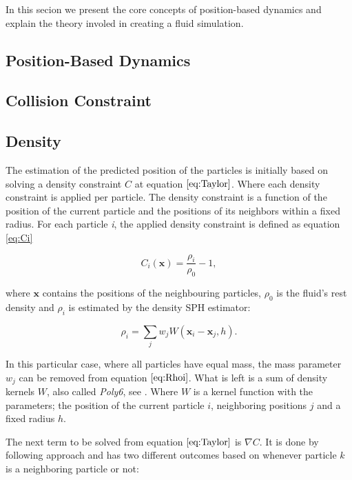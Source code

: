 In this secion we present the core concepts of position-based dynamics and
explain the theory involed in creating a fluid simulation.

\subsection{Position-Based Dynamics}



\subsection{Collision Constraint}


\subsection{Density}

The estimation of the predicted position of the particles is initially based on
solving a density constraint $C$ at equation $\ref{eq:Taylor}$. Where each
density constraint is applied per particle. The density constraint is a
function of the position of the current particle and the positions of its
neighbors within a fixed radius. For each particle \textit{i}, the applied
density constraint is defined as equation \ref{eq:Ci}

\begin{equation}
\label{eq:Ci}
C_i(\mathbf{x}) = \frac{\rho_i}{\rho_0} - 1,
\end{equation}

where $\mathbf{x}$ contains the positions of the neighbouring particles,
$\rho_0$ is the fluid's rest density and $\rho_i$ is estimated by the density
SPH estimator:

\begin{equation}
\label{eq:Rhoi}
\rho_i = \sum\limits_{j} w_j W(\mathbf{x}_i - \mathbf{x}_j, h).
\end{equation}

In this particular case, where all particles have equal mass, the mass
parameter $w_j$ can be removed from equation $\ref{eq:Rhoi}$. What is left is a
sum of density kernels $W$, also called \textit{Poly6}, see
\cite{muller2003particle}. Where $W$ is a kernel function with the parameters;
the position of the current particle  $i$, neighboring positions $j$ and a
fixed radius $h$.

The next term to be solved from equation $\ref{eq:Taylor}$ is $\nabla C$. It is
done by following \cite{macklin2013position} approach and has two different
outcomes based on whenever particle $k$ is a neighboring particle or not:

